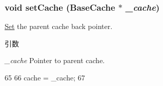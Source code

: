 \hypertarget{classBaseTags_a6a5d34a51c5ba1c4f87dbcc59e8b13fb}{
\subsubsection[{setCache}]{\setlength{\rightskip}{0pt plus 5cm}void setCache ({\bf BaseCache} $\ast$ {\em \_\-cache})}}
\label{classBaseTags_a6a5d34a51c5ba1c4f87dbcc59e8b13fb}
\hyperlink{classSet}{Set} the parent cache back pointer. 
\begin{DoxyParams}{引数}
\item[{\em \_\-cache}]Pointer to parent cache. \end{DoxyParams}



\begin{DoxyCode}
65 {
66     cache = _cache;
67 }
\end{DoxyCode}


